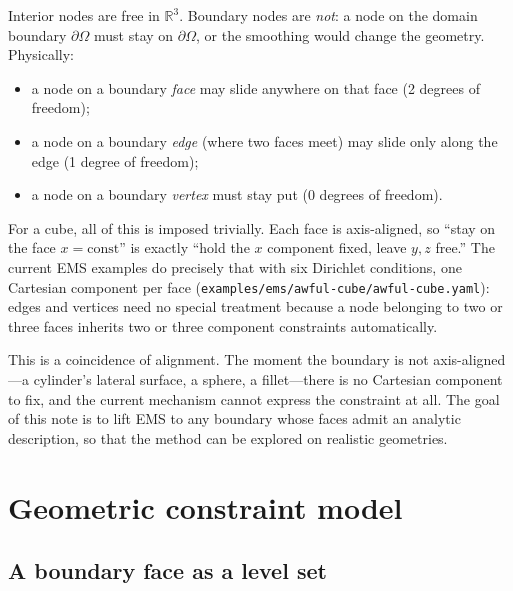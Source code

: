 \documentclass[11pt]{article}
\newcommand{\Real}{\mathbb{R}}
\newcommand{\code}[1]{\texttt{#1}}
\begin{document}
Interior nodes are free in $\Real^3$. Boundary nodes are \emph{not}: a node on
the domain boundary $\partial\Omega$ must stay on $\partial\Omega$, or the
smoothing would change the geometry. Physically:
\begin{itemize}[nosep]
  \item a node on a boundary \emph{face} may slide anywhere on that face
        (2 degrees of freedom);
  \item a node on a boundary \emph{edge} (where two faces meet) may slide only
        along the edge (1 degree of freedom);
  \item a node on a boundary \emph{vertex} must stay put (0 degrees of freedom).
\end{itemize}

For a cube, all of this is imposed trivially. Each face is axis-aligned, so
``stay on the face $x=\text{const}$'' is exactly ``hold the $x$ component
fixed, leave $y,z$ free.'' The current EMS examples do precisely that with six
Dirichlet conditions, one Cartesian component per face
(\code{examples/\allowbreak ems/\allowbreak awful-cube/\allowbreak awful-cube.yaml}):
edges and vertices need no special treatment because a node belonging to two or
three faces inherits two or three component constraints automatically.

This is a coincidence of alignment. The moment the boundary is not
axis-aligned---a cylinder's lateral surface, a sphere, a fillet---there is no
Cartesian component to fix, and the current mechanism cannot express the
constraint at all. The goal of this note is to lift EMS to any boundary whose
faces admit an analytic description, so that the method can be explored on
realistic geometries.

\section{Geometric constraint model}
\label{sec:model}

\subsection{A boundary face as a level set}
\end{document}
